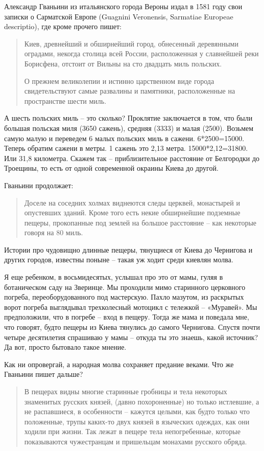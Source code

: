 Александр Гваньини из итальянского города Вероны издал в 1581 году свои записки о Сарматской Европе (Guagnini Veronensis, Sarmatiae Europeae descriptio), где кроме прочего пишет:

\begin{quotation}
Киев, древнейший и обширнейший город, обнесенный деревянными оградами, некогда столица всей России, расположенная у славнейшей реки Борисфена, отстоит от Вильны на сто двадцать миль польских.

О прежнем великолепии и истинно царственном виде города свидетельствуют самые развалины и памятники, расположенные на пространстве шести миль.
\end{quotation}

А шесть польских миль – это сколько? Проклятие заключается в том, что были большая польская миля (3650 сажень), средняя (3333) и малая (2500). Возьмем самую малую и переведем 6 малых польских миль в сажени. 6*2500=15000. Теперь обратим сажени в метры. 1 сажень это 2,13 метра. 15000*2,12=31800. Или 31,8 километра. Скажем так – приблизительное расстояние от Белгородки до Троещины, то есть от одной современной окраины Киева до другой.

Гваньини продолжает:

\begin{quotation}
Доселе на соседних холмах виднеются следы церквей, монастырей и опустевших зданий. Кроме того есть некие обширнейшие подземные пещеры, прокопанные под землей на большое расстояние – как некоторые говоря на 80 миль.
\end{quotation}

Истории про чудовищно длинные пещеры, тянущиеся от Киева до Чернигова и других городов, известны поныне – такая уж ходит среди киевлян молва. 

Я еще ребенком, в восьмидесятых, услышал про это от мамы, гуляя в ботаническом саду на Зверинце. Мы проходили мимо старинного церковного погреба, переоборудованного под мастерскую. Пахло мазутом, из раскрытых ворот погреба выглядывал трехколесный мотоцикл с тележкой – «Муравей». Мы предположили, что в погребе – вход в пещеру. Тогда же мама и поведала мне, что говорят, будто пещеры из Киева тянулись до самого Чернигова. Спустя почти четыре десятилетия спрашиваю у мамы – откуда ты это знаешь, какой источник? Да вот, просто бытовало такое мнение.

Как ни опровергай, а народная молва сохраняет предание веками. Что же Гваньини пишет дальше?

\begin{quotation}
В пещерах видны многие старинные гробницы и тела некоторых знаменитых русских князей, (давно похороненные) но только истлевшие, а не распавшиеся, в особенности – кажутся целыми, как будто только что положенные, трупы каких-то двух князей в языческих одеждах, как они ходили при жизни. Так лежат в пещере тела непогребенные, которые показываются чужестранцам и пришельцам монахами русского обряда.
\end{quotation}

